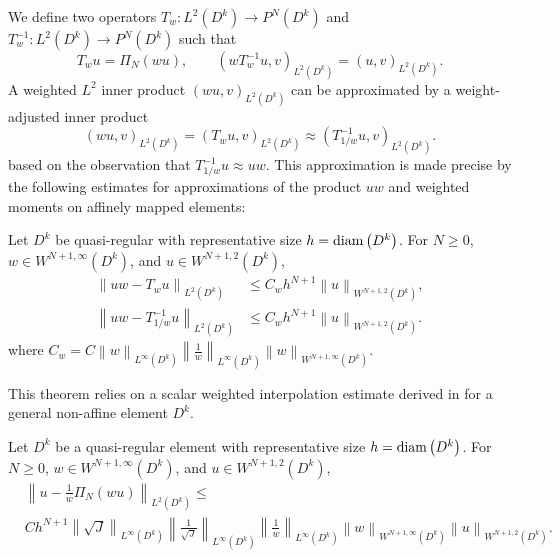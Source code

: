 \documentclass{siamart0216}
\newcommand{\nor}[1]{\left\| #1 \right\|}
\newcommand{\LRp}[1]{\left( #1 \right)}
\newcommand{\LRb}[1]{\left| #1 \right|}
\newcommand{\Lk}{L^2\LRp{D^k}}
\newcommand{\LinfDk}{L^{\infty}\LRp{D^k}}
\begin{document}
We define two operators $T_w: L^2\LRp{D^k} \rightarrow P^N\LRp{D^k}$ and $T^{-1}_w: L^2\LRp{D^k} \rightarrow P^N\LRp{D^k}$ such that
\[
T_wu = \Pi_N(wu), \qquad \LRp{wT^{-1}_wu,v}_{\Lk} = \LRp{u,v}_{\Lk}.  
\]
A weighted $L^2$ inner product $\LRp{wu,v}_{\Lk}$ can be approximated by a weight-adjusted inner product
\[
\LRp{wu,v}_{\Lk} = \LRp{T_wu,v}_{\Lk}\approx \LRp{T^{-1}_{1/w}u,v}_{\Lk}.  
\]
based on the observation that $T^{-1}_{1/w}u \approx uw$.  This approximation is made precise by the following estimates for approximations of the product $uw$ and weighted moments on affinely mapped elements:
\begin{theorem}
Let $D^k$ be quasi-regular with representative size $h = {\rm diam}\LRp{D^k}$.  For $N \geq 0$, $w\in W^{N+1,\infty}\LRp{D^k}$, and $u \in W^{N+1,2}\LRp{D^k}$, 
\begin{align}
\nor{{u}{w}-T_{w}u}_{L^2\LRp{D^k}} &\leq C_wh^{N+1} \nor{u}_{W^{N+1,2}\LRp{D^k}},\\
\nor{{u}{w}-T^{-1}_{1/w}u}_{L^2\LRp{D^k}} &\leq C_wh^{N+1}   \nor{u}_{W^{N+1,2}\LRp{D^k}}.
\end{align}
where $C_w = C\nor{w}_{L^{\infty}\LRp{D^k}}\nor{\frac{1}{w}}_{L^{\infty}\LRp{D^k}} \nor{w}_{W^{N+1,\infty}\LRp{D^k}}$.
\end{theorem}

This theorem relies on a scalar weighted interpolation estimate derived in \cite{warburton2013low,chan2016weight1} for a general non-affine element $D^k$.  
\begin{theorem}
Let $D^k$ be a quasi-regular element with representative size $h = {\rm diam}\LRp{D^k}$. For $N \geq 0$, $w\in W^{N+1,\infty}\LRp{D^k}$, and $u\in W^{N+1,2}\LRp{D^k}$, 
\begin{align*}
&\nor{u - \frac{1}{w}\Pi_N(wu)}_{\Lk} \leq \\
&C h^{N+1} \nor{{\sqrt{J}}}_{\LinfDk}\nor{\frac{1}{\sqrt{J}}}_{\LinfDk}\nor{\frac{1}{w}}_{\LinfDk}\nor{w}_{W^{N+1,\infty}\LRp{D^k}}\nor{u}_{W^{N+1,2}\LRp{D^k}}.
\end{align*}
\label{thm:wproj}
\end{theorem}
\end{document}
